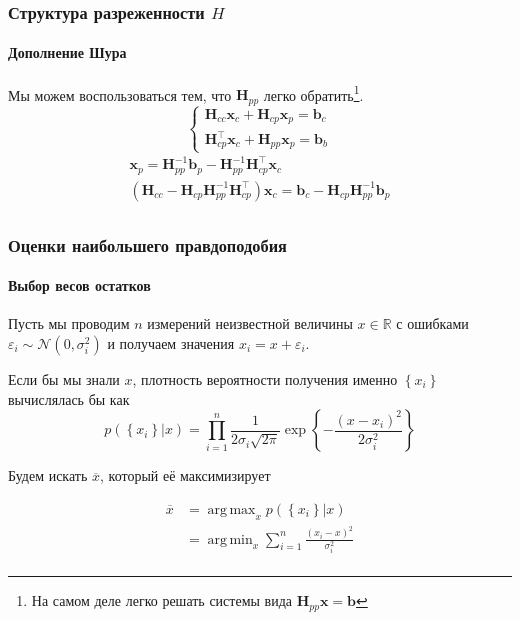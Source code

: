 \documentclass[notheorems,aspectratio=169]{beamer}
\DeclareMathOperator*{\argmax}{arg\,max}
\DeclareMathOperator*{\argmin}{arg\,min}
\begin{document}
\begin{frame}
  \frametitle{Структура разреженности $H$}
  \framesubtitle{Дополнение Шура}
  Мы можем воспользоваться тем, что $\mathbf{H}_{pp}$ легко обратить\footnote[frame]{На самом деле легко решать системы вида $\mathbf{H}_{pp}\mathbf{x}=\mathbf{b}$}.
  $$
  \begin{cases}
    \mathbf{H}_{cc}\mathbf{x}_c+\mathbf{H}_{cp}\mathbf{x}_p=\mathbf{b}_c \\
    \mathbf{H}_{cp}^\intercal\mathbf{x}_c+\mathbf{H}_{pp}\mathbf{x}_p=\mathbf{b}_b
  \end{cases}
  $$
  \begin{equation*}
    \begin{gathered}
    \mathbf{x}_{p}=\mathbf{H}_{pp}^{-1}\mathbf{b}_p-\mathbf{H}_{pp}^{-1}\mathbf{H}_{cp}^\intercal\mathbf{x}_c \\
       \left(\mathbf{H}_{cc}-\mathbf{H}_{cp}\mathbf{H}_{pp}^{-1}\mathbf{H}_{cp}^\intercal\right)\mathbf{x}_c=\mathbf{b}_c-\mathbf{H}_{cp}\mathbf{H}_{pp}^{-1}\mathbf{b}_p \\
    \end{gathered}
  \end{equation*}
\end{frame}

\begin{frame}
  \frametitle{Оценки наибольшего правдоподобия}
  \framesubtitle{Выбор весов остатков}
  Пусть мы проводим $n$ измерений неизвестной величины $x\in\mathbb{R}$ с ошибками $\varepsilon_i\sim\mathcal{N}\left(0,\sigma_i^2\right)$ и получаем значения $x_i=x+\varepsilon_i$.
  
  Если бы мы знали $x$, плотность вероятности получения именно $\left\{x_i\right\}$ вычислялась бы как
  $$p\left(\left.\left\{x_i\right\}\right\rvert x\right)=\prod_{i=1}^n\frac{1}{2\sigma_i\sqrt{2\pi}}\exp\left\{-\frac{\left(x-x_i\right)^2}{2\sigma_i^2}\right\}$$

  Будем искать $\overline{x}$, который её максимизирует

  \begin{align*}
    \overline{x} & =\argmax_{x}p\left(\left.\left\{x_i\right\}\right\rvert x\right) \\
                 & =\argmin_{x}\sum_{i=1}^n\frac{\left(x_i-x\right)^2}{\sigma_i^2} \\
  \end{align*}
  
\end{frame}
\end{document}
